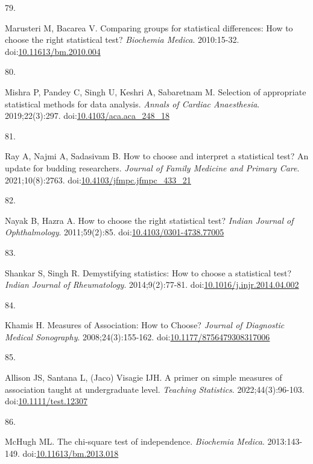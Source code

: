 \documentclass[
]{book}
\newlength{\cslhangindent}
\newlength{\csllabelwidth}
\newlength{\cslentryspacingunit} %
\newenvironment{CSLReferences}[2] %
 {%
  \setlength{\parindent}{0pt}
  \ifodd #1
  \let\oldpar\par
  \def\par{\hangindent=\cslhangindent\oldpar}
  \fi
  \setlength{\parskip}{#2\cslentryspacingunit}
 }%
 {}
\newcommand{\CSLLeftMargin}[1]{\parbox[t]{\csllabelwidth}{#1}}
\newcommand{\CSLRightInline}[1]{\parbox[t]{\linewidth - \csllabelwidth}{#1}\break}
\begin{document}
\begin{CSLReferences}{0}{0}
\leavevmode{}%
\CSLLeftMargin{79. }%
\CSLRightInline{Marusteri M, Bacarea V. Comparing groups for statistical differences: How to choose the right statistical test? \emph{Biochemia Medica}. 2010:15-32. doi:\href{https://doi.org/10.11613/bm.2010.004}{10.11613/bm.2010.004}}

\leavevmode{}%
\CSLLeftMargin{80. }%
\CSLRightInline{Mishra P, Pandey C, Singh U, Keshri A, Sabaretnam M. Selection of appropriate statistical methods for data analysis. \emph{Annals of Cardiac Anaesthesia}. 2019;22(3):297. doi:\href{https://doi.org/10.4103/aca.aca_248_18}{10.4103/aca.aca\_248\_18}}

\leavevmode{}%
\CSLLeftMargin{81. }%
\CSLRightInline{Ray A, Najmi A, Sadasivam B. How to choose and interpret a statistical test? An update for budding researchers. \emph{Journal of Family Medicine and Primary Care}. 2021;10(8):2763. doi:\href{https://doi.org/10.4103/jfmpc.jfmpc_433_21}{10.4103/jfmpc.jfmpc\_433\_21}}

\leavevmode{}%
\CSLLeftMargin{82. }%
\CSLRightInline{Nayak B, Hazra A. How to choose the right statistical test? \emph{Indian Journal of Ophthalmology}. 2011;59(2):85. doi:\href{https://doi.org/10.4103/0301-4738.77005}{10.4103/0301-4738.77005}}

\leavevmode{}%
\CSLLeftMargin{83. }%
\CSLRightInline{Shankar S, Singh R. Demystifying statistics: How to choose a statistical test? \emph{Indian Journal of Rheumatology}. 2014;9(2):77-81. doi:\href{https://doi.org/10.1016/j.injr.2014.04.002}{10.1016/j.injr.2014.04.002}}

\leavevmode{}%
\CSLLeftMargin{84. }%
\CSLRightInline{Khamis H. Measures of Association: How to Choose? \emph{Journal of Diagnostic Medical Sonography}. 2008;24(3):155-162. doi:\href{https://doi.org/10.1177/8756479308317006}{10.1177/8756479308317006}}

\leavevmode{}%
\CSLLeftMargin{85. }%
\CSLRightInline{Allison JS, Santana L, (Jaco) Visagie IJH. A primer on simple measures of association taught at undergraduate level. \emph{Teaching Statistics}. 2022;44(3):96-103. doi:\href{https://doi.org/10.1111/test.12307}{10.1111/test.12307}}

\leavevmode{}%
\CSLLeftMargin{86. }%
\CSLRightInline{McHugh ML. The chi-square test of independence. \emph{Biochemia Medica}. 2013:143-149. doi:\href{https://doi.org/10.11613/bm.2013.018}{10.11613/bm.2013.018}}


\end{CSLReferences}
\end{document}
